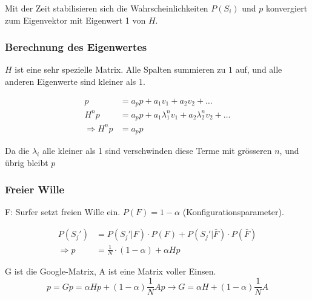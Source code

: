 \documentclass[10pt,a4paper]{scrartcl}
\begin{document}
Mit der Zeit stabilisieren sich die Wahrscheinlichkeiten $P(S_i)$ und $p$ konvergiert zum Eigenvektor mit Eigenwert 1 von $H$.

\subsubsection{Berechnung des Eigenwertes}
$H$ ist eine sehr spezielle Matrix. Alle Spalten summieren zu $1$ auf, und alle anderen Eigenwerte sind kleiner als $1$.

\begin{align*}
p &= a_pp + a_1v_1 + a_2v_2 + \dots \\
H^np &= a_pp + a_1\lambda_1^nv_1 + a_2\lambda_2^nv_2 + \dots \\
\Rightarrow H^np &=a_pp
\end{align*}

Da die $\lambda_i$ alle kleiner als 1 sind verschwinden diese Terme mit grösseren $n$, und übrig bleibt $p$

\subsubsection{Freier Wille}
F: Surfer setzt freien Wille ein. $P(F) = 1 - \alpha$ (Konfigurationsparameter).

\begin{align*}
P(S_{j}') & = P(S_{j}'|F)\cdot P(F) + P(S_{j}'|\bar{F})\cdot P(\bar{F}) \\
\Rightarrow p & = \frac{1}{N}\cdot (1-\alpha) +  \alpha Hp
\end{align*}

G ist die Google-Matrix, A ist eine Matrix voller Einsen.
$$
p = Gp = \alpha Hp + (1-\alpha)\frac{1}{N}Ap \rightarrow G = \alpha H + (1-\alpha)\frac{1}{N}A $$
$$
\end{document}
